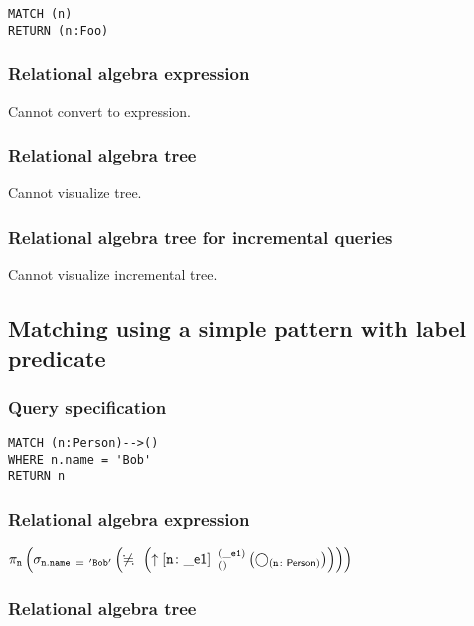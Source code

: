 \begin{lstlisting}
MATCH (n)
RETURN (n:Foo)
\end{lstlisting}

\subsubsection*{Relational algebra expression}

Cannot convert to expression.

\subsubsection*{Relational algebra tree}

Cannot visualize tree.

\subsubsection*{Relational algebra tree for incremental queries}

Cannot visualize incremental tree.

\subsection{Matching using a simple pattern with label predicate}

\subsubsection*{Query specification}

\begin{lstlisting}
MATCH (n:Person)-->()
WHERE n.name = 'Bob'
RETURN n
\end{lstlisting}

\subsubsection*{Relational algebra expression}

$\projection{\var{n}} \left(\selection{\mathtt{n.name~=~'Bob'}} \left(\alldifferent{} \left(\expandout{n}{\_e1}{}{\_e1}{} \left(\getvertices{n}{Person}\right)\right)\right)\right)$

\subsubsection*{Relational algebra tree}


